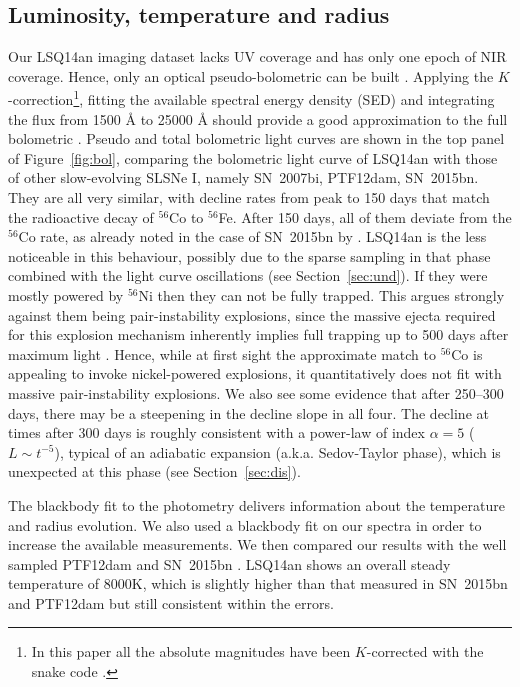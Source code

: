\documentclass[useAMS,usenatbib]{mn2e}
\def\ni{$^{56}$Ni}
\def\co{$^{56}$Co}
\def\fe{$^{56}$Fe}
\def\an{LSQ14an}
\begin{document}
\subsection{Luminosity, temperature and radius}\label{sec:bol}

Our \an\/ imaging dataset lacks UV coverage and has only one epoch of NIR coverage. Hence, only an optical pseudo-bolometric can be built \citep[see][for further details in the construction of the bolometric light curve]{in16b}. Applying the $K$-correction\footnote{In this paper all the absolute magnitudes have been $K$-corrected with the {\sc snake} code \citep{in16b}.}, fitting the available spectral energy density (SED) and integrating the flux from 1500 \AA\/ to 25000 \AA\/ should provide a good approximation to the full bolometric \citep[see][]{in13,in16a}. 
Pseudo and total bolometric light curves are shown in the top panel of Figure~\ref{fig:bol}, 
comparing the bolometric light curve of \an\/  with those of other slow-evolving SLSNe I, namely SN~2007bi, PTF12dam, SN~2015bn. They are all very similar, with decline rates from peak to 150 days that match 
the radioactive decay of \co\/ to \fe\/.  After 150 days, all of them deviate from the \co\/ rate, as already noted in the case of SN~2015bn by \citep{ni16b}. \an\/ is the less noticeable in this behaviour, possibly due to the sparse sampling in that phase combined with the light curve oscillations (see Section~\ref{sec:und}). If 
they were mostly powered by \ni\/  then they can not be fully trapped. This argues strongly against them
being pair-instability explosions, since the massive ejecta required for this explosion mechanism inherently 
implies full trapping up to 500 days after maximum light \citep{je16a}. Hence, while at first sight the 
approximate match to \co\/ is appealing to invoke nickel-powered explosions, it quantitatively does not fit with 
massive pair-instability explosions. We also see some evidence that after  250--300 days, there may be  a steepening in the decline slope in all four. The decline at times after 300 days
is roughly consistent with a power-law of index $\alpha = 5$ ($L\sim t^{-5}$), typical of an adiabatic expansion (a.k.a. Sedov-Taylor phase), which is unexpected at this phase (see Section~\ref{sec:dis}). 


The blackbody fit to the photometry delivers information about the temperature and radius evolution. We also used a blackbody fit on our spectra in order to increase the available measurements. We then compared our results with the well sampled PTF12dam \citep{ch15,vr16} and SN~2015bn \citep{ni16a,ni16b}. \an\/ shows an overall steady temperature of 8000K, which is slightly higher than that measured in SN~2015bn and PTF12dam but still consistent within the errors. 
\end{document}
